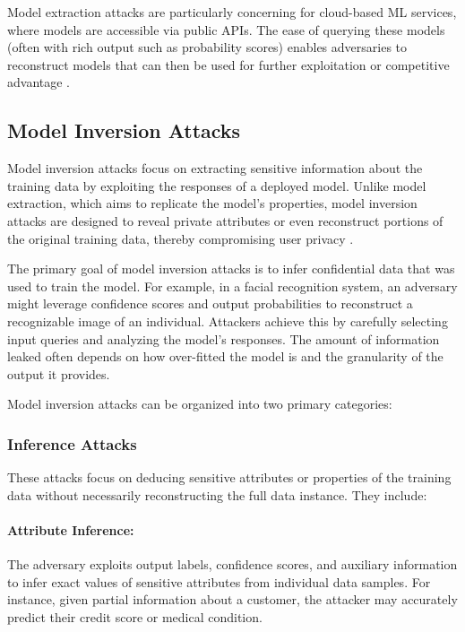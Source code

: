 \documentclass[conference]{IEEEtran}
\begin{document}
Model extraction attacks are particularly concerning for cloud-based ML services, where models are accessible via public APIs. The ease of querying these models (often with rich output such as probability scores) enables adversaries to reconstruct models that can then be used for further exploitation or competitive advantage \cite{gong2020model}.


\subsection{Model Inversion Attacks}

Model inversion attacks focus on extracting sensitive information about the training data by exploiting the responses of a deployed model. Unlike model extraction, which aims to replicate the model’s properties, model inversion attacks are designed to reveal private attributes or even reconstruct portions of the original training data, thereby compromising user privacy \cite{dibbo2023sok}.

The primary goal of model inversion attacks is to infer confidential data that was used to train the model. For example, in a facial recognition system, an adversary might leverage confidence scores and output probabilities to reconstruct a recognizable image of an individual. Attackers achieve this by carefully selecting input queries and analyzing the model's responses. The amount of information leaked often depends on how over-fitted the model is and the granularity of the output it provides.

Model inversion attacks can be organized into two primary categories:

\subsubsection{Inference Attacks}
These attacks focus on deducing sensitive attributes or properties of the training data without necessarily reconstructing the full data instance. They include:

\paragraph{Attribute Inference:}
The adversary exploits output labels, confidence scores, and auxiliary information to infer exact values of sensitive attributes from individual data samples. For instance, given partial information about a customer, the attacker may accurately predict their credit score or medical condition.
\end{document}
